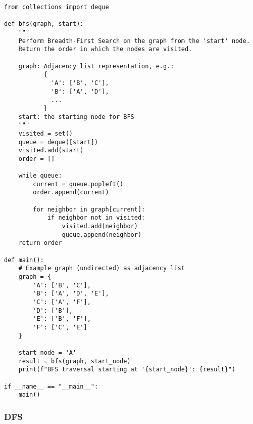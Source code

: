 \documentclass[a4paper,12pt]{article}
\begin{document}
\begin{lstlisting}[style=pythonstyle]
from collections import deque

def bfs(graph, start):
    """
    Perform Breadth-First Search on the graph from the 'start' node.
    Return the order in which the nodes are visited.
    
    graph: Adjacency list representation, e.g.:
           {
             'A': ['B', 'C'],
             'B': ['A', 'D'],
             ...
           }
    start: the starting node for BFS
    """
    visited = set()
    queue = deque([start])
    visited.add(start)
    order = []

    while queue:
        current = queue.popleft()
        order.append(current)

        for neighbor in graph[current]:
            if neighbor not in visited:
                visited.add(neighbor)
                queue.append(neighbor)
    return order

def main():
    # Example graph (undirected) as adjacency list
    graph = {
        'A': ['B', 'C'],
        'B': ['A', 'D', 'E'],
        'C': ['A', 'F'],
        'D': ['B'],
        'E': ['B', 'F'],
        'F': ['C', 'E']
    }

    start_node = 'A'
    result = bfs(graph, start_node)
    print(f"BFS traversal starting at '{start_node}': {result}")

if __name__ == "__main__":
    main()

\end{lstlisting}

\subsubsection{DFS}
\end{document}
